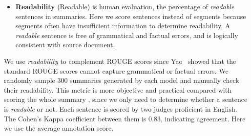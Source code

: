 \begin{itemize}
\item \textbf{Readability} (Readable) is human evaluation, 
the percentage of
\textit{readable} sentences in summaries.
Here we score sentences instead of segments because segments often have
insufficient information to determine readability.
A \textit{readable} sentence is free of grammatical and 
factual errors, 
and is logically consistent with source document.
\end{itemize}

We use \textit{readability} to complement ROUGE scores 
since Yao~\cite{YaoWX17} showed that the standard 
ROUGE scores cannot capture grammatical or factual errors. 
We randomly sample 300 summaries generated by each model
and manually check their readability. 
This metric is more objective and practical compared with
scoring the whole summary \cite{D18-1205}, since we only need 
to determine whether a sentence is {\em readable} or not.
Each sentence is scored by two judges proficient in English. 
The Cohen's Kappa coefficient between them is $0.83$, 
indicating agreement. Here we use the average annotation score.

